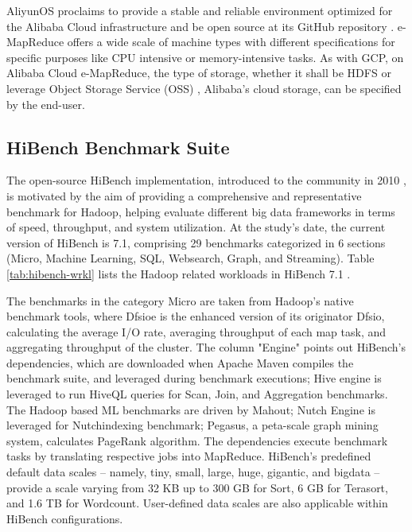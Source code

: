 \documentclass[review]{elsarticle}
\begin{document}
AliyunOS proclaims to provide a stable and reliable environment optimized for the Alibaba Cloud infrastructure and be open source at its GitHub repository \cite{noauthor_alibaba_nodate}. e-MapReduce offers a wide scale of machine types with different specifications for specific purposes like CPU intensive or memory-intensive tasks. As with GCP, on Alibaba Cloud e-MapReduce, the type of storage, whether it shall be HDFS or leverage Object Storage Service (OSS) \cite{noauthor_oss_nodate}, Alibaba's cloud storage, can be specified by the end-user.

\subsection{HiBench Benchmark Suite}\label{benchmarks_hibench}
The open-source HiBench \cite{noauthor_intel-bigdatahibench_2021} implementation, introduced to the community in 2010 \cite{huang_hibench_2010}, is motivated by the aim of providing a comprehensive and representative benchmark for Hadoop, helping evaluate different big data frameworks in terms of speed, throughput, and system utilization. At the study's date, the current version of HiBench is 7.1, comprising 29 benchmarks categorized in 6 sections (Micro, Machine Learning, SQL, Websearch, Graph, and Streaming). Table \ref{tab:hibench-wrkl} lists the Hadoop related workloads in HiBench 7.1 \cite{noauthor_release_nodate}. 

The benchmarks in the category Micro are taken from Hadoop's native benchmark tools, where Dfsioe is the enhanced version of its originator Dfsio, calculating the average I/O rate, averaging throughput of each map task, and aggregating throughput of the cluster. The column "Engine" points out HiBench's dependencies, which are downloaded when Apache Maven compiles the benchmark suite, and leveraged during benchmark executions; Hive engine is leveraged to run HiveQL queries for Scan, Join, and Aggregation benchmarks. The Hadoop based ML benchmarks are driven by Mahout; Nutch Engine is leveraged for Nutchindexing benchmark; Pegasus, a peta-scale graph mining system, calculates PageRank algorithm. The dependencies execute benchmark tasks by translating respective jobs into MapReduce. HiBench's predefined default data scales -- namely, tiny, small, large, huge, gigantic, and bigdata -- provide a scale varying from 32 KB up to 300 GB for Sort, 6 GB for Terasort, and 1.6 TB for Wordcount. User-defined data scales are also applicable within HiBench configurations.
\end{document}
